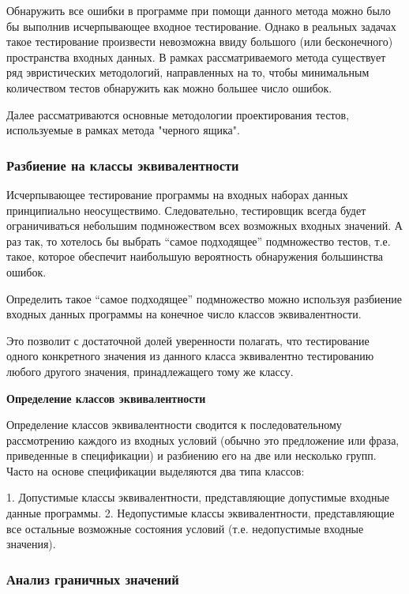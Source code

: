 \documentclass[12pt]{article}
\begin{document}
Обнаружить все ошибки в программе при помощи данного метода
можно было бы выполнив исчерпывающее входное тестирование. Однако в реальных задачах такое тестирование произвести невозможна ввиду
большого (или бесконечного) пространства входных данных. В рамках
рассматриваемого метода существует ряд эвристических методологий,
направленных на то, чтобы минимальным количеством тестов обнаружить как можно большее число ошибок.

  
Далее рассматриваются основные методологии проектирования тестов, используемые в рамках метода "черного ящика".



\subsubsection{Разбиение на классы эквивалентности}

Ис­черпывающее тестирование программы на входных наборах данных
принципиально неосуществимо. Следовательно, тестировщик всегда будет ограничиваться небольшим подмножеством всех возможных входных зна­чений. А раз так, то хотелось бы выбрать “самое подходящее” подмножество тестов, т.е. такое, которое обеспечит наибольшую веро­ятность обнаружения большинства ошибок.

Определить такое “самое подходящее” подмножество можно используя разбиение входных данных программы на конечное число классов эквивалентности.

Это позволит с достаточной долей уверенности  полагать, что тестирование одного конкретного значения из данного класса эквивалентно тестированию любого другого значения, принадлежащего тому же классу.

{\bf Определение классов эквивалентности}

Определение классов эквивалентности сводится к последовательному рассмотрению каждого из входных условий (обычно это предложение или фраза, приведенные в спецификации) и разбиению его на две или несколько групп. Часто на основе спецификации выделяются два типа классов:

1. Допустимые классы эквивалентности, представляющие допустимые входные данные программы.
2. Недопустимые классы эквивалентности, представляющие все остальные возможные со­стояния условий (т.е. недопустимые входные значения).	



\subsubsection{Анализ граничных значений}
\end{document}
